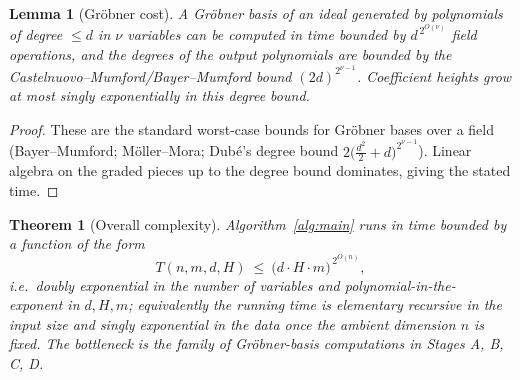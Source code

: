 \documentclass{amsart}
\theoremstyle{plain}
\newtheorem{theorem}{Theorem}
\newtheorem{lemma}{Lemma}
\theoremstyle{definition}
\begin{document}
\begin{lemma}[Gr\"obner cost]\label{lem:groebner}
A Gr\"obner basis of an ideal generated by polynomials of degree $\le d$ in $\nu$
variables can be computed in time bounded by $d^{\,2^{O(\nu)}}$ field operations,
and the degrees of the output polynomials are bounded by the
Castelnuovo--Mumford/Bayer--Mumford bound $(2d)^{2^{\nu-1}}$.  Coefficient
heights grow at most singly exponentially in this degree bound.
\end{lemma}

\begin{proof}
These are the standard worst-case bounds for Gr\"obner bases over a field
(Bayer--Mumford; M\"oller--Mora; Dub\'e's degree bound
$2\big(\tfrac{d^2}{2}+d\big)^{2^{\nu-1}}$).  Linear algebra on the graded pieces
up to the degree bound dominates, giving the stated time.
\end{proof}

\begin{theorem}[Overall complexity]\label{thm:complexity}
Algorithm~\ref{alg:main} runs in time bounded by a function of the form
\[
T(n,m,d,H)\ \le\ \big(d\cdot H\cdot m\big)^{\,2^{O(n)}},
\]
i.e.\ doubly exponential in the number of variables and polynomial-in-the-
exponent in $d,H,m$; equivalently the running time is \emph{elementary recursive}
in the input size and singly exponential in the data once the ambient dimension
$n$ is fixed.  The bottleneck is the family of Gr\"obner-basis computations in
Stages A, B, C, D.
\end{theorem}
\end{document}
